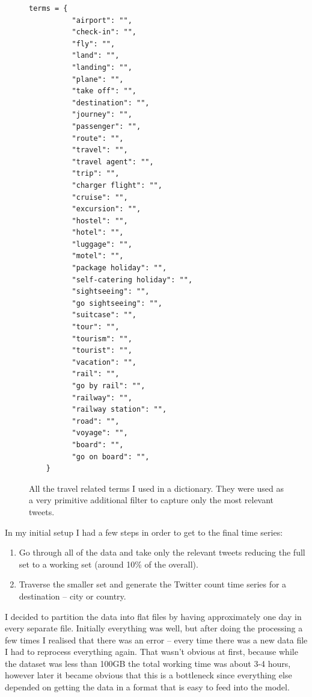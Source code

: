 \documentclass[minf,twoside,singlespacing,parskip,frontabs,notimes,11pt]{infthesis}
\begin{document}
\begin{figure}[]
\begin{center}
\begin{lstlisting}
terms = {
          "airport": "",
          "check-in": "",
          "fly": "",
          "land": "",
          "landing": "",
          "plane": "",
          "take off": "",
          "destination": "",
          "journey": "",
          "passenger": "",
          "route": "",
          "travel": "",
          "travel agent": "",
          "trip": "",
          "charger flight": "",
          "cruise": "",
          "excursion": "",
          "hostel": "",
          "hotel": "",
          "luggage": "",
          "motel": "",
          "package holiday": "",
          "self-catering holiday": "",
          "sightseeing": "",
          "go sightseeing": "",
          "suitcase": "",
          "tour": "",
          "tourism": "",
          "tourist": "",
          "vacation": "",
          "rail": "",
          "go by rail": "",
          "railway": "",
          "railway station": "",
          "road": "",
          "voyage": "",
          "board": "",
          "go on board": "",
	}
\end{lstlisting}
\end{center}
\caption{All the travel related terms I used in a dictionary. They were used as a very primitive additional filter to capture only the most relevant tweets. }
\end{figure}

%


In my initial setup I had a few steps in order to get to the final time series:
\begin{enumerate}
\item Go through all of the data and take only the relevant tweets reducing the full set to a working set (around 10\% of the overall).
\item Traverse the smaller set and generate the Twitter count time series for a destination -- city or country. 
\end{enumerate}

I decided to partition the data into flat files by having approximately one day in every separate file. Initially everything was well, but after doing the processing a few times I realised that there was an error -- every time there was a new data file I had to reprocess everything again. That wasn't obvious at first, because while the dataset was less than 100GB the total working time was about 3-4 hours, however later it became obvious that this is a bottleneck since everything else depended on getting the data in a format that is easy to feed into the model.
\end{document}

